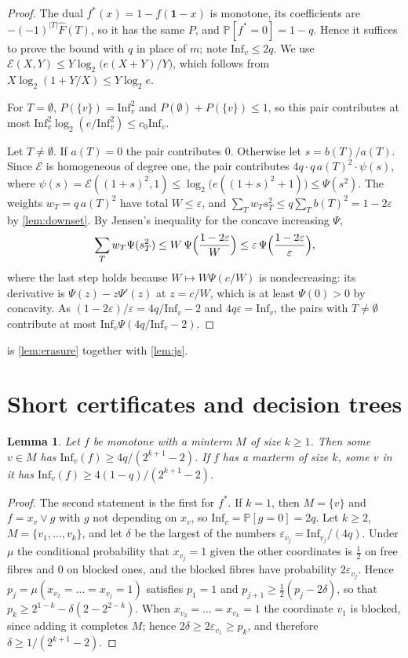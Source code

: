 \documentclass[11pt]{amsart}
\newtheorem{lemma}[theorem]{Lemma}
\theoremstyle{remark}
\renewcommand{\Pr}{\mathbb{P}}
\newcommand{\Inf}{\mathrm{Inf}}
\newcommand{\eps}{\varepsilon}
\begin{document}
\begin{proof}
The dual $f^*(x)=1-f(\mathbf 1-x)$ is monotone, its coefficients are $-(-1)^{|T|}\widehat F(T)$, so it has the same
$P$, and $\Pr[f^*=0]=1-q$. Hence it suffices to prove the bound with $q$ in place of $m$; note $\Inf_v\le2q$. We use
$\mathcal E(X,Y)\le Y\log_2\bigl(e(X+Y)/Y\bigr)$, which follows from $X\log_2(1+Y/X)\le Y\log_2e$.

For $T=\emptyset$, $P(\{v\})=\Inf_v^2$ and $P(\emptyset)+P(\{v\})\le1$, so this pair contributes at most
$\Inf_v^2\log_2(e/\Inf_v^2)\le c_0\Inf_v$.

Let $T\neq\emptyset$. If $a(T)=0$ the pair contributes $0$. Otherwise let $s=b(T)/a(T)$. Since $\mathcal E$ is
homogeneous of degree one, the pair contributes $4q\cdot q\,a(T)^2\cdot\psi(s)$, where
$\psi(s)=\mathcal E((1+s)^2,1)\le\log_2\bigl(e((1+s)^2+1)\bigr)\le\Psi(s^2)$. The weights $w_T=q\,a(T)^2$ have total
$W\le\eps$, and $\sum_Tw_Ts_T^2\le q\sum_Tb(T)^2=1-2\eps$ by \cref{lem:downset}. By Jensen's inequality for the
concave increasing $\Psi$,
\[
\sum_T w_T\Psi(s_T^2)\le W\,\Psi\Bigl(\frac{1-2\eps}W\Bigr)\le \eps\,\Psi\Bigl(\frac{1-2\eps}{\eps}\Bigr),
\]
where the last step holds because $W\mapsto W\Psi(c/W)$ is nondecreasing: its derivative is $\Psi(z)-z\Psi'(z)$ at
$z=c/W$, which is at least $\Psi(0)>0$ by concavity. As $(1-2\eps)/\eps=4q/\Inf_v-2$ and $4q\eps=\Inf_v$, the pairs
with $T\neq\emptyset$ contribute at most $\Inf_v\Psi(4q/\Inf_v-2)$.
\end{proof}

 is \cref{lem:erasure} together with \cref{lem:js}.

\section{Short certificates and decision trees}

\begin{lemma}\label{lem:cert}
Let $f$ be monotone with a minterm $M$ of size $k\ge1$. Then some $v\in M$ has
$\Inf_v(f)\ge 4q/(2^{k+1}-2)$. If $f$ has a maxterm of size $k$, some $v$ in it has
$\Inf_v(f)\ge4(1-q)/(2^{k+1}-2)$.
\end{lemma}

\begin{proof}
The second statement is the first for $f^*$. If $k=1$, then $M=\{v\}$ and $f=x_v\vee g$ with $g$ not depending on
$x_v$, so $\Inf_v=\Pr[g=0]=2q$. Let $k\ge2$, $M=\{v_1,\dots,v_k\}$, and let $\delta$ be the largest of the numbers
$\eps_{v_j}=\Inf_{v_j}/(4q)$. Under $\mu$ the conditional probability that $x_{v_j}=1$ given the other coordinates is
$\frac12$ on free fibres and $0$ on blocked ones, and the blocked fibres have probability $2\eps_{v_j}$. Hence
$p_j=\mu(x_{v_2}=\dots=x_{v_j}=1)$ satisfies $p_1=1$ and $p_{j+1}\ge\frac12(p_j-2\delta)$, so that
$p_k\ge2^{1-k}-\delta(2-2^{2-k})$. When $x_{v_2}=\dots=x_{v_k}=1$ the coordinate $v_1$ is blocked, since adding it
completes $M$; hence $2\delta\ge2\eps_{v_1}\ge p_k$, and therefore $\delta\ge1/(2^{k+1}-2)$.
\end{proof}
\end{document}
